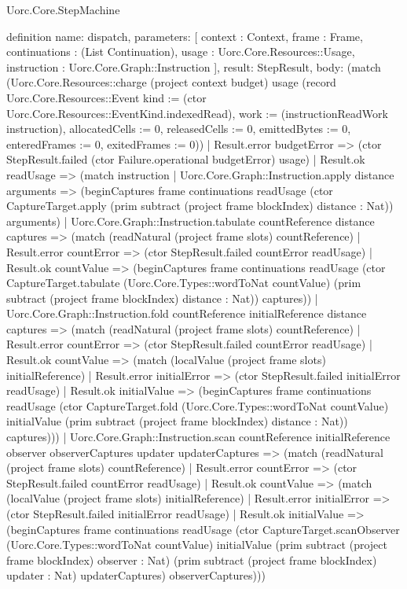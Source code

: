 \begin{lexlean}{Uorc.Core.StepMachine}
\begin{semanticmodule}
definition{
  name: dispatch,
  parameters: [
    context : Context,
    frame : Frame,
    continuations : (List Continuation),
    usage : Uorc.Core.Resources::Usage,
    instruction : Uorc.Core.Graph::Instruction
  ],
  result: StepResult,
  body: (match (Uorc.Core.Resources::charge (project context budget) usage (record Uorc.Core.Resources::Event {kind := (ctor Uorc.Core.Resources::EventKind.indexedRead), work := (instructionReadWork instruction), allocatedCells := 0, releasedCells := 0, emittedBytes := 0, enteredFrames := 0, exitedFrames := 0}))
    | Result.error budgetError => (ctor StepResult.failed (ctor Failure.operational budgetError) usage)
    | Result.ok readUsage => (match instruction
      | Uorc.Core.Graph::Instruction.apply distance arguments => (beginCaptures frame continuations readUsage (ctor CaptureTarget.apply (prim subtract (project frame blockIndex) distance : Nat)) arguments)
      | Uorc.Core.Graph::Instruction.tabulate countReference distance captures => (match (readNatural (project frame slots) countReference)
        | Result.error countError => (ctor StepResult.failed countError readUsage)
        | Result.ok countValue => (beginCaptures frame continuations readUsage (ctor CaptureTarget.tabulate (Uorc.Core.Types::wordToNat countValue) (prim subtract (project frame blockIndex) distance : Nat)) captures))
      | Uorc.Core.Graph::Instruction.fold countReference initialReference distance captures => (match (readNatural (project frame slots) countReference)
        | Result.error countError => (ctor StepResult.failed countError readUsage)
        | Result.ok countValue => (match (localValue (project frame slots) initialReference)
          | Result.error initialError => (ctor StepResult.failed initialError readUsage)
          | Result.ok initialValue => (beginCaptures frame continuations readUsage (ctor CaptureTarget.fold (Uorc.Core.Types::wordToNat countValue) initialValue (prim subtract (project frame blockIndex) distance : Nat)) captures)))
      | Uorc.Core.Graph::Instruction.scan countReference initialReference observer observerCaptures updater updaterCaptures => (match (readNatural (project frame slots) countReference)
        | Result.error countError => (ctor StepResult.failed countError readUsage)
        | Result.ok countValue => (match (localValue (project frame slots) initialReference)
          | Result.error initialError => (ctor StepResult.failed initialError readUsage)
          | Result.ok initialValue => (beginCaptures frame continuations readUsage (ctor CaptureTarget.scanObserver (Uorc.Core.Types::wordToNat countValue) initialValue (prim subtract (project frame blockIndex) observer : Nat) (prim subtract (project frame blockIndex) updater : Nat) updaterCaptures) observerCaptures)))
}
\end{semanticmodule}
\end{lexlean}
